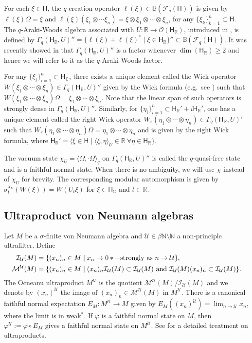 \documentclass[a4paper,11pt]{amsart}
\theoremstyle{definition}
\newcommand{\B}{{\mathbb B}}
\newcommand{\C}{{\mathbb C}}
\newcommand{\N}{{\mathbb N}}
\newcommand{\R}{{\mathbb R}}
\newcommand{\cF}{{\mathcal F}}
\newcommand{\cI}{{\mathcal I}}
\newcommand{\cM}{{\mathcal M}}
\newcommand{\cO}{{\mathcal O}}
\newcommand{\cU}{{\mathcal U}}
\newcommand{\sH}{\mathsf{H}}
\newcommand{\ot}{\otimes}
\begin{document}
For each $\xi\in \sH$, the $q$-creation operator $\ell(\xi)\in \B(\cF_q(\sH))$ is given by 
	$\ell(\xi)\Omega=\xi$ and $\ell(\xi)(\xi_1\ot\cdots\xi_n)=\xi\ot \xi_1\ot \cdots\ot \xi_n$,
	for any $\{\xi_k\}_{k=1}^n\subset \sH$.
The $q$-Araki-Woods algebra associated with $U:\R\to \cO(\sH_\R)$, introduced in \cite{Hia03},
	is defined by $\Gamma_q(\sH_\R, U)''=\{\ell(\xi)+\ell(\xi)^*\mid \xi\in \sH_\R\}''\subset \B(\cF_q(\sH))$.
It was recently showed in \cite{KSW23} that $\Gamma_q(\sH_\R, U)''$ is a factor whenever $\dim(\sH_\R)\geq 2$
	and hence we will refer to it as the $q$-Araki-Woods factor.
	
For any $\{\xi_i\}_{i=1}^n\subset \sH_\C$, there exists a unique element called the Wick operator 
	$W(\xi_1\ot \cdots \ot \xi_n)\in \Gamma_q(\sH_\R, U)''$
	given by the Wick formula (e.g.\ see \cite[Proposition 2.1]{BMRW23}) such that $W(\xi_1\ot \cdots \ot \xi_n)\Omega=\xi_1\ot \cdots \ot \xi_n$.
Note that the linear span of such operators is strongly dense in $\Gamma_q(\sH_\R, U)''$.
Similarly, for $\{\eta_i\}_{i=1}^n\subset \sH_\R'+i\sH_\R'$, one has a unique element called the right Wick operator
	$W_r(\eta_1\ot \cdots \ot \eta_n)\in \Gamma_q(\sH_\R, U)'$ such that $W_r(\eta_1\ot \cdots \ot \eta_n)\Omega=\eta_1\ot \cdots \ot \eta_n$
	and is given by the right Wick formula,
	where $\sH_\R'=\langle \xi\in \sH\mid \langle \xi, \eta\rangle_U\in\R\  \forall\eta\in \sH_\R\}$.

	

The vacuum state $\chi_U=\langle \Omega, \cdot \Omega\rangle_q	$ on $\Gamma_q(\sH_\R, U)''$ is called the $q$-quasi-free state
	and is a faithful normal state. 
	When there is no ambiguity, we will use $\chi$ instead of $\chi_U$ for brevity.
The corresponding modular automorphism is given by
	$\sigma^{\chi_U}_t(W(\xi))=W(U_t\xi)$ for $\xi\in \sH_\C$ and $t\in \R$.

	

\subsection{Ultraproduct von Neumann algebras}

Let $M$ be a $\sigma$-finite von Neumann algebra and $\cU\in \beta\N\setminus \N$ a non-principle ultrafilter.
Define
\[\begin{aligned}
	\cI_\cU(M)&=\{(x_n)_n\in M\mid x_n\to 0 *-{\rm strongly\ as\ }n\to \cU\},\\
	\cM^\cU(M)&=\{(x_n)_n\in M\mid (x_n)_n\cI_\cU(M)\subset \cI_\cU(M){\rm \ and\ }\cI_\cU(M)(x_n)_n\subset \cI_{\cU}(M)\}.
\end{aligned}
\]
The Ocneanu ultraproduct $M^\cU$ is the quotient $\cM^\cU(M)/\cI_\cU(M)$ \cite{Oc85}
	and we denote by $(x_n)^\cU$ the image of $(x_n)_n\in \cM^\cU(M)$ in $M^\cU$.
There is a canonical faithful normal expectation $E_M: M^\cU\to M$ given by $E_M((x_n)^\cU)=\lim_{n\to \cU} x_n$,
	where the limit is in weak$^*$.
If $\varphi$ is a faithful normal state on $M$, then $\varphi^\cU:=\varphi\circ E_M$ gives a faithful normal state on $M^\cU$.
See \cite{AnHa14} for a detailed treatment on ultraproducts.
\end{document}
